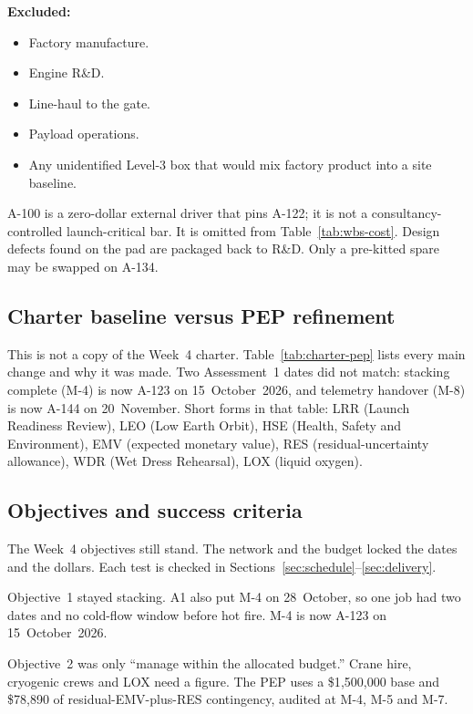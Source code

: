 \textbf{Excluded:}
\begin{itemize}[leftmargin=1.4em,itemsep=0.25em]
\item Factory manufacture.
\item Engine R\&D.
\item Line-haul to the gate.
\item Payload operations.
\item Any unidentified Level-3 box that would mix factory product into a site baseline.
\end{itemize}

A-100 is a zero-dollar external driver that pins A-122; it is not a consultancy-controlled launch-critical bar. It is omitted from Table~\ref{tab:wbs-cost}. Design defects found on the pad are packaged back to R\&D. Only a pre-kitted spare may be swapped on A-134.

\subsection{Charter baseline versus PEP refinement}
\label{sec:overview-changes}

This is not a copy of the Week~4 charter. Table~\ref{tab:charter-pep} lists every main change and why it was made. Two Assessment~1 dates did not match: stacking complete (M-4) is now A-123 on 15~October~2026, and telemetry handover (M-8) is now A-144 on 20~November. Short forms in that table: LRR (Launch Readiness Review), LEO (Low Earth Orbit), HSE (Health, Safety and Environment), EMV (expected monetary value), RES (residual-uncertainty allowance), WDR (Wet Dress Rehearsal), LOX (liquid oxygen).



\subsection{Objectives and success criteria}
\label{sec:overview-objectives}

The Week~4 objectives still stand. The network and the budget locked the dates and the dollars. Each test is checked in Sections~\ref{sec:schedule}--\ref{sec:delivery}.

Objective~1 stayed stacking. A1 also put M-4 on 28~October, so one job had two dates and no cold-flow window before hot fire. M-4 is now A-123 on 15~October~2026.

Objective~2 was only ``manage within the allocated budget.'' Crane hire, cryogenic crews and LOX need a figure. The PEP uses a \$1{,}500{,}000 base and \$78{,}890 of residual-EMV-plus-RES contingency, audited at M-4, M-5 and M-7.

